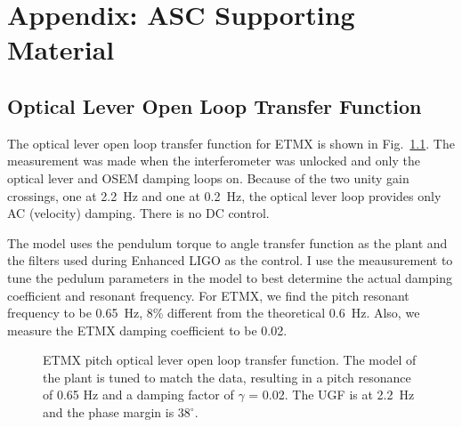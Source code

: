 \chapter{Appendix: ASC Supporting Material}



\section{Optical Lever Open Loop Transfer Function}
\label{sec:oplevOLG}
The optical lever open loop transfer function for ETMX is shown in
Fig.~\ref{fig:oplevOLG}. The measurement was made when the
interferometer was unlocked and only the optical lever and OSEM
damping loops on. Because of the two unity gain crossings, one at
2.2~Hz and one at 0.2~Hz, the optical lever loop provides only AC
(velocity) damping. There is no DC control. 

The model uses the pendulum torque to angle transfer function as the
plant and the filters used during Enhanced LIGO as the control. I use
the meausurement to tune the pedulum parameters in the model to best
determine the actual damping coefficient and resonant frequency. For
ETMX, we find the pitch resonant frequency to be 0.65~Hz, 8\%
different from the theoretical 0.6~Hz. Also, we measure the ETMX
damping coefficient to be 0.02.


\begin{figure}
\begin{centering}
\caption[Optical lever open loop transfer function]{ETMX pitch optical
  lever open loop transfer function. The model of the plant is tuned
  to match the data, resulting in a pitch resonance of 0.65 Hz and a
  damping factor of $\gamma$ = 0.02. The UGF is at 2.2~Hz and the
  phase margin is $38^\circ$.}
\label{fig:oplevOLG}
\end{centering}
\end{figure}





